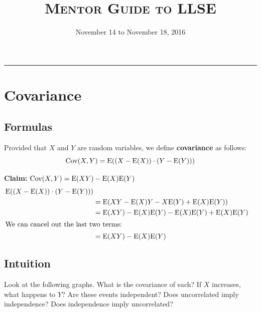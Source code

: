 \documentclass{exam}
\title{\textsc{Mentor Guide to LLSE}}
\date{November 14 to November 18, 2016}
\begin{document}
\maketitle
\rule{\textwidth}{0.15em}
\fontsize{12}{15}\selectfont
\thispagestyle{empty}

\section{Covariance}
\subsection{Formulas}
Provided that $X$ and $Y$ are random variables, we define \textbf{covariance} as follows:
\[\text{Cov}(X, Y) = \text{E}((X - \text{E}(X)) \cdot (Y - \text{E}(Y)))\]

\textbf{Claim:} $\text{Cov}(X, Y) = \text{E}(XY) - \text{E}(X)\text{E}(Y)$
\begin{align*}
\text{E}((X - \text{E}(X)) \cdot (Y - \text{E}(Y))) \\
&= \text{E}(XY - \text{E}(X)Y - X\text{E}(Y) + \text{E}(X)\text{E}(Y))\\
&= \text{E}(XY) - \text{E}(X)\text{E}(Y) - \text{E}(X)\text{E}(Y) + \text{E}(X)\text{E}(Y)\\
\intertext{We can cancel out the last two terms:}
&= \text{E}(XY) - \text{E}(X)\text{E}(Y)
\end{align*}

\subsection{Intuition}
Look at the following graphs. What is the covariance of each? If $X$ increases, what happens to $Y$? Are these events independent? Does uncorrelated imply independence? Does independence imply uncorrelated?
\end{document}
